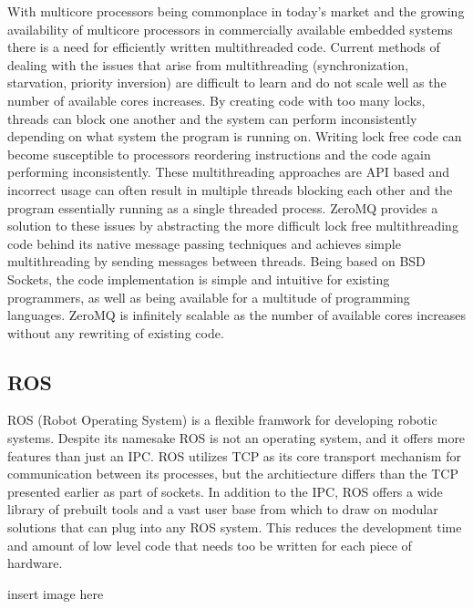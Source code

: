 With multicore processors being commonplace in today’s market and the growing availability of multicore processors in commercially available embedded systems there is a need for efficiently written multithreaded code. Current methods of dealing with the issues that arise from multithreading (synchronization, starvation, priority inversion) are difficult to learn and do not scale well as the number of available cores increases. By creating code with too many locks, threads can block one another and the system can perform inconsistently depending on what system the program is running on. Writing lock free code can become susceptible to processors reordering instructions and the code again performing inconsistently. These multithreading approaches are API based and incorrect usage can often result in multiple threads blocking each other and the program essentially running as a single threaded process. 
ZeroMQ provides a solution to these issues by abstracting the more difficult lock free multithreading code behind its native message passing techniques and achieves simple multithreading by sending messages between threads. Being based on BSD Sockets, the code implementation is simple and intuitive for existing programmers, as well as being available for a multitude of programming languages. ZeroMQ is infinitely scalable as the number of available cores increases without any rewriting of existing code.


\subsection{ROS}

ROS (Robot Operating System) is a flexible framwork for developing robotic systems. Despite its namesake ROS is not an operating system, and it offers more features than just an IPC. ROS utilizes TCP as its core transport mechanism for communication between its processes, but the architiecture differs than the TCP presented earlier as part of sockets. In addition to the IPC, ROS offers a wide library of prebuilt tools and a vast user base from which to draw on modular solutions that can plug into any ROS system. This reduces the development time and amount of low level code that needs too be written for each piece of hardware.

insert image here

